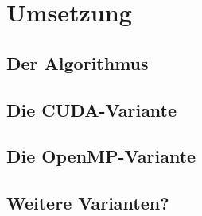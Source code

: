 \chapter{Umsetzung}

\section{Der Algorithmus}

\section{Die CUDA-Variante}

\section{Die OpenMP-Variante}

\section{Weitere Varianten?}

